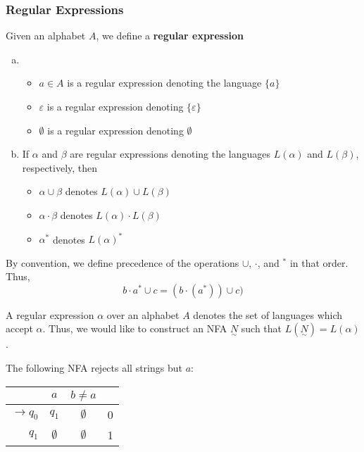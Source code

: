 \subsubsection{Regular Expressions}\label{subsubsec:regular-expressions}
\begin{definition}
Given an alphabet \(A\), we define a \textbf{regular expression}
\begin{enumerate}[(a)]
    \item \begin{itemize}
        \item \(a\in A\) is a regular expression denoting the language \(\{a\}\)
        \item \(\varepsilon\) is a regular expression denoting \(\{\varepsilon\}\)
        \item \(\emptyset\) is a regular expression denoting \(\emptyset\)
    \end{itemize}
    
    \item If \(\alpha\) and \(\beta\) are regular expressions denoting the languages \(L(\alpha)\) and \(L(\beta)\), respectively, then 
    \begin{itemize}
        \item \(\alpha\cup\beta\) denotes \(L(\alpha)\cup L(\beta)\)
        \item \(\alpha\cdot\beta\) denotes \(L(\alpha)\cdot L(\beta)\)
        \item \(\alpha^*\) denotes \(L(\alpha)^*\)
    \end{itemize}
\end{enumerate}
\end{definition}

By convention, we define precedence of the operations \(\cup\), \(\cdot\), and \(^*\) in that order. Thus, \[b\cdot a^*\cup c=(b\cdot(a^*))\cup c)\]

A regular expression \(\alpha\) over an alphabet \(A\) denotes the set of languages which accept \(\alpha\). Thus, we would like to construct an NFA \(\underset{\sim}{N}\) such that \(L(\underset{\sim}{N})=L(\alpha)\).

The following NFA rejects all strings but \(a\):

\begin{center}\begin{tabular}{r| c c r}
      & \(a\) & \(b\neq a\) & \\\bottomrule
      \(\to q_0\) & \(q_1\) & \(\emptyset\) & 0\\
            \(q_1\) & \(\emptyset\) & \(\emptyset\) & 1\\
 \end{tabular}\end{center}

